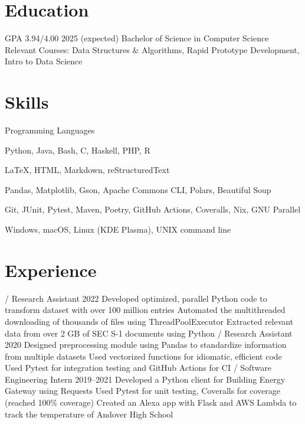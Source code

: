 \section{Education}
\begin{doutline}
     GPA 3.94/4.00 \hfill 2025 (expected)
        \2 Bachelor of Science in Computer Science
        \2 Relevant Courses: Data Structures \& Algorithms, Rapid Prototype Development, Intro to Data Science
\end{doutline}

\section{Skills}
\begin{labeling}{Programming Languages}
    \item [Programming Languages] Python, Java, Bash, C, Haskell, PHP, R
    \item [Markup Languages] \LaTeX, HTML, Markdown, reStructuredText
    \item [Libraries] Pandas, Matplotlib, Gson, Apache Commons CLI, Polars, Beautiful Soup
    \item [Tools] Git, JUnit, Pytest, Maven, Poetry, GitHub Actions, Coveralls, Nix, GNU Parallel
    \item [Operating Systems] Windows, macOS, Linux (KDE Plasma), UNIX command line
\end{labeling}

\section{Experience}
\begin{doutline}
     / Research Assistant \hfill 2022
        \2 Developed optimized, parallel Python code to transform dataset with over 100 million entries
        \2 Automated the multithreaded downloading of thousands of files using ThreadPoolExecutor
        \2 Extracted relevant data from over 2 GB of SEC S-1 documents using Python
     / Research Assistant \hfill 2020
        \2 Designed preprocessing module using Pandas to standardize information from multiple datasets
            \3 Used vectorized functions for idiomatic, efficient code
            \3 Used Pytest for integration testing and GitHub Actions for CI
     / Software Engineering Intern \hfill 2019--2021
        \2 Developed a Python client for Building Energy Gateway using Requests
            \3 Used Pytest for unit testing, Coveralls for coverage (reached 100\% coverage)
        \2 Created an Alexa app with Flask and AWS Lambda to track the temperature of Andover High School
\end{doutline}

